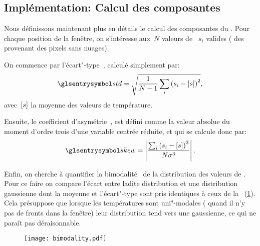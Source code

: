 \subsection{Implémentation: Calcul des composantes}
\label{sec:calcul-composantes}

Nous définissons maintenant plus en détails le calcul des composantes du .
Pour chaque position de la fenêtre, on s'intéresse aux~\(N\) valeurs de ~\(s_{i}\) valides ( des provenant des pixels sans nuages).

On commence par l'écart"-type~, calculé simplement par:
\begin{equation}
  \am{std} = \sqrt{\frac{1}{N-1} \sum_i \paren{s_i - \moy{s}}^2},
\end{equation}
avec~\(\left[s\right]\) la moyenne des valeurs de température.

Ensuite, le coefficient d'asymétrie~, est défini comme la valeur absolue du moment d'ordre trois d'une variable centrée réduite, et qui se calcule donc par:
\begin{equation}
  \am{skew} = \abs{\frac{\sum_i \paren{s_i - \moy{s}}^3} {N \sigma^3}}.
\end{equation}

Enfin, on cherche à quantifier la bimodalité~ de la distribution des valeurs de .
Pour ce faire on compare l'écart entre ladite distribution et une distribution gaussienne dont la moyenne et l'écart"-type sont pris identiques à ceux de la ~(\cref{fig:bimodality}).
Cela présuppose que lorsque les températures sont uni"-modales ( quand il n'y pas de fronts dans la fenêtre) leur distribution tend vers une gaussienne, ce qui ne paraît pas déraisonnable.

\begin{figure}
  \centering
  \texttt{[image: bimodality.pdf]}
  \label{fig:bimodality}
\end{figure}


